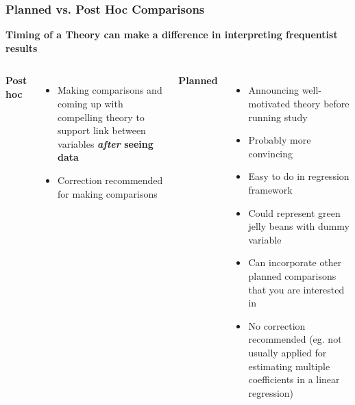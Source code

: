 \documentclass[10pt, block=fill]{beamer}
\begin{document}
\begin{frame}
  \frametitle{Planned vs. Post Hoc Comparisons}

  \textbf{Timing of a Theory can make a difference in interpreting frequentist results}

  \vspace{0.2in}
  
  \begin{columns}[t]
    \textbf{Post hoc}
    \begin{itemize}
      \item Making comparisons and coming up with compelling theory to support link between variables \textbf{\textit{after} seeing data}
      \item Correction recommended for making comparisons
    \end{itemize}
    
  \textbf{Planned}
  \begin{itemize}
    \item Announcing well-motivated theory before running study
    \item Probably more convincing
    \item Easy to do in regression framework
    \item Could represent green jelly beans with dummy variable
    \item Can incorporate other planned comparisons that you are interested in
    \item No correction recommended (eg. not usually applied for estimating multiple coefficients in a linear regression)
  \end{itemize}
  
  \end{columns}

\end{frame}
\end{document}
